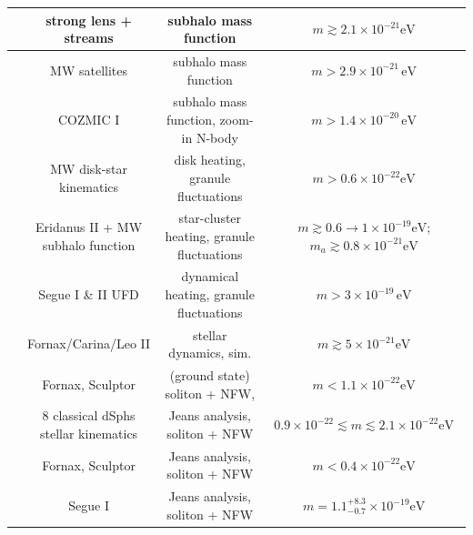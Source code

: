 \begin{table}[!htbp]
{\begin{tabular}{|c|c|c|c|}
            \hline \cite{schutz2020subhalo}              & strong lens + streams                                 & subhalo mass function                         & $m\gtrsim2.1\times10^{-21}\mathrm{eV}$ \\
            \hline \cite{nadler2021constraints}          & MW satellites                                         & subhalo mass function                         & $m > 2.9\times 10^{-21}\,\mathrm{eV}$ \\
            \hline \cite{nadler2024cozmic}               & COZMIC I                                              & subhalo mass function, zoom-in N-body         & $m >1.4\times10^{-20}\,\mathrm{eV}$ \\
            \hline   
            \hline \cite{church2019heating}              & MW disk-star kinematics                               & disk heating, granule fluctuations            & $m > 0.6\times10^{-22}\mathrm{eV}$ \\
            \hline \cite{marsh2019strong}                & Eridanus II + MW subhalo function                     & star-cluster heating, granule fluctuations    & $m\gtrsim0.6 \to 1\times10^{-19}\mathrm{eV}$; $m_a\gtrsim0.8\times10^{-21}\mathrm{eV}$ \\
            \hline \cite{dalal2022excluding}             & Segue I \& II UFD                                     & dynamical heating, granule fluctuations       & $m>3\times10^{-19}\,\mathrm{eV}$ \\
            \hline \cite{teodori2025ultralight}          & Fornax/Carina/Leo II                                  & stellar dynamics, sim.                        & $m \gtrsim 5\times10^{-21}\mathrm{eV}$ \\
            \hline
            \hline \cite{marsh2015axion}                 & Fornax, Sculptor                                      & (ground state) soliton + NFW,                 & $m < 1.1\times10^{-22}\mathrm{eV}$ \\
            \hline \cite{chen2017jeans}                  & 8 classical dSphs stellar kinematics                  & Jeans analysis, soliton + NFW                 & $0.9 \times 10^{-22} \lesssim m \lesssim 2.1 \times 10^{-22}\mathrm{eV}$ \\
            \hline \cite{gonzalez-morales2017unbiased}   & Fornax, Sculptor                                      & Jeans analysis, soliton + NFW                 & $m < 0.4\times10^{-22}\mathrm{eV}$ \\
            \hline \cite{hayashi2021narrowing}           & Segue I                                               & Jeans analysis, soliton + NFW                 & $m =1.1_{-0.7}^{+8.3}\times10^{-19}\mathrm{eV}$ \\

\end{tabular}}
\end{table}
